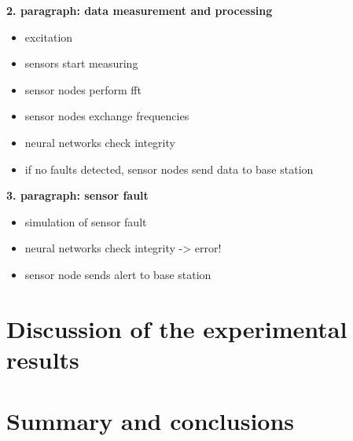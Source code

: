 \documentclass[12pt]{scrartcl}
\begin{document}
\textbf{2. paragraph: data measurement and processing}

\begin{itemize}
\item excitation
\item sensors start measuring
\item sensor nodes perform fft
\item sensor nodes exchange frequencies
\item neural networks check integrity
\item if no faults detected, sensor nodes send data to base station
\end{itemize}

\textbf{3. paragraph: sensor fault}

\begin{itemize}
\item simulation of sensor fault
\item neural networks check integrity -> error!
\item sensor node sends alert to base station
\end{itemize}


\section*{Discussion of the experimental results}


\section*{Summary and conclusions}




\end{document}
